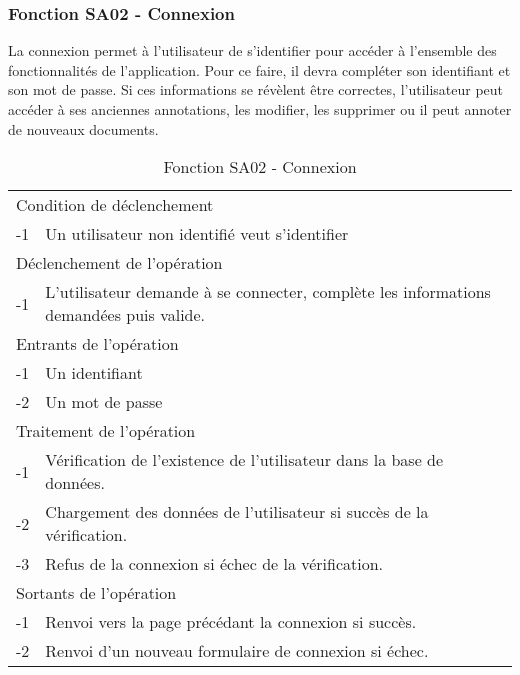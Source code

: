\documentclass[a4paper]{article}
\begin{document}
    
\subsubsection{Fonction SA02 - Connexion}

La connexion permet à l’utilisateur de s’identifier pour accéder à l’ensemble des fonctionnalités de l’application. Pour ce faire, il devra compléter son identifiant et son mot de passe. Si ces informations se révèlent être correctes, l’utilisateur peut accéder à ses anciennes annotations, les modifier, les supprimer ou il peut annoter de nouveaux documents.

\begin{table}[H]
  \centering
   \small
	\begin{tabular}{|c|p{12cm}|}
   		\hline
   			\rowcolor{lightgray}\multicolumn{2}{|c|}{\textbf{Fonction SA02 - Connexion}} \\
   		\hline
   			\multicolumn{2}{|l|}{Condition de déclenchement} \\
   		\hline
   			-1 & Un utilisateur non identifié veut s'identifier\\
   		\hline
   			\multicolumn{2}{|l|}{Déclenchement de l'opération} \\
   		\hline
   			-1 & L'utilisateur demande à se connecter, complète les informations demandées puis valide.\\
   		\hline
   			\multicolumn{2}{|l|}{Entrants de l'opération} \\
   		\hline
   			-1 & Un identifiant\\
        	-2 & Un mot de passe\\
   		\hline
   			\multicolumn{2}{|l|}{Traitement de l'opération} \\
  		\hline
   			-1 & Vérification de l’existence de l'utilisateur dans la base de données.\\
        	-2 & Chargement des données de l'utilisateur si succès de la vérification.\\
        	-3 & Refus de la connexion si échec de la vérification.\\
   		\hline
   			\multicolumn{2}{|l|}{Sortants de l'opération} \\
   		\hline
   			-1 & Renvoi vers la page précédant la connexion si succès.\\
            -2 & Renvoi d'un nouveau formulaire de connexion si échec.\\
   		\hline
	\end{tabular}
  \caption{Fonction SA02 - Connexion}
  \normalsize
  \label{tab: connexion}
\end{table}
\end{document}
